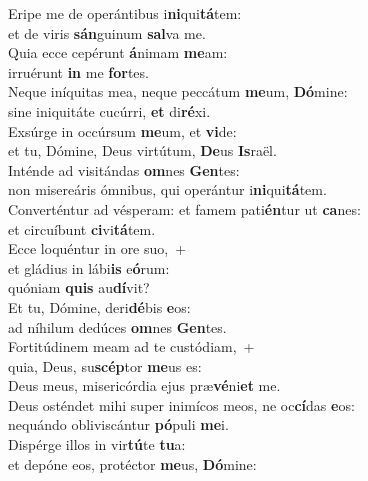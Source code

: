 \evenverse Eripe me de operántibus i\textbf{ni}qui\textbf{tá}tem:~\*\\
\evenverse et de viris \textbf{sán}guinum \textbf{sal}va me.\\
\oddverse Quia ecce cepérunt \textbf{á}nimam \textbf{me}am:~\*\\
\oddverse irruérunt \textbf{in} me \textbf{for}tes.\\
\evenverse Neque iníquitas mea, neque peccátum \textbf{me}um, \textbf{Dó}mine:~\*\\
\evenverse sine iniquitáte cucúrri, \textbf{et} di\textbf{ré}xi.\\
\oddverse Exsúrge in occúrsum \textbf{me}um, et \textbf{vi}de:~\*\\
\oddverse et tu, Dómine, Deus virtútum, \textbf{De}us \textbf{Is}raël.\\
\evenverse Inténde ad visitándas \textbf{om}nes \textbf{Gen}tes:~\*\\
\evenverse non misereáris ómnibus, qui operántur i\textbf{ni}qui\textbf{tá}tem.\\
\oddverse Converténtur ad vésperam: et famem pati\textbf{én}tur ut \textbf{ca}nes:~\*\\
\oddverse et circuíbunt \textbf{ci}vi\textbf{tá}tem.\\
\evenverse Ecce loquéntur in ore suo,~+\\
\evenverse  et gládius in lábi\textbf{is} e\textbf{ó}rum:~\*\\
\evenverse quóniam \textbf{quis} au\textbf{dí}vit?\\
\oddverse Et tu, Dómine, deri\textbf{dé}bis \textbf{e}os:~\*\\
\oddverse ad níhilum dedúces \textbf{om}nes \textbf{Gen}tes.\\
\evenverse Fortitúdinem meam ad te custódiam,~+\\
\evenverse  quia, Deus, su\textbf{scép}tor \textbf{me}us es:~\*\\
\evenverse Deus meus, misericórdia ejus præ\textbf{vé}ni\textbf{et} me.\\
\oddverse Deus osténdet mihi super inimícos meos, ne oc\textbf{cí}das \textbf{e}os:~\*\\
\oddverse nequándo obliviscántur \textbf{pó}puli \textbf{me}i.\\
\evenverse Dispérge illos in vir\textbf{tú}te \textbf{tu}a:~\*\\
\evenverse et depóne eos, protéctor \textbf{me}us, \textbf{Dó}mine:\\
